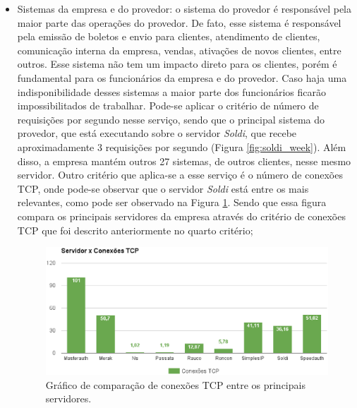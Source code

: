 \begin{itemize}
 \item Sistemas da empresa e do provedor: o sistema do provedor é responsável pela maior parte das operações do provedor. De fato, esse sistema é
 responsável pela emissão de boletos e envio para clientes, atendimento de clientes, comunicação interna da empresa, vendas, ativações de novos 
 clientes, entre outros. Esse sistema não tem um impacto direto para os clientes, porém é fundamental para os funcionários da empresa e do provedor. 
 Caso haja uma indisponibilidade desses sistemas a maior parte dos funcionários ficarão impossibilitados de trabalhar.
 Pode-se aplicar o critério de número de requisições por segundo nesse serviço, sendo que o principal sistema do provedor, que está 
 executando sobre o servidor \textit{Soldi}, que recebe aproximadamente 3 requisições por segundo (Figura \ref{fig:soldi_week}). Além disso, a empresa 
 mantém outros 27 sistemas, de outros clientes, nesse mesmo servidor. Outro critério que aplica-se a esse serviço é o número de conexões \ac{TCP}, 
 onde pode-se observar que o servidor \textit{Soldi} está entre os mais relevantes, como pode ser observado na Figura \ref{fig:servico_tcp}.
 Sendo que essa figura compara os principais servidores da empresa através do critério de conexões \ac{TCP} que foi descrito anteriormente no 
 quarto critério;
 
\begin{figure}[h!]
 \centering
 \includegraphics[width=430px]{img/servico_tcp.eps}
 \caption{Gráfico de comparação de conexões TCP entre os principais servidores.}
 \label{fig:servico_tcp}
\end{figure}



\end{itemize}
